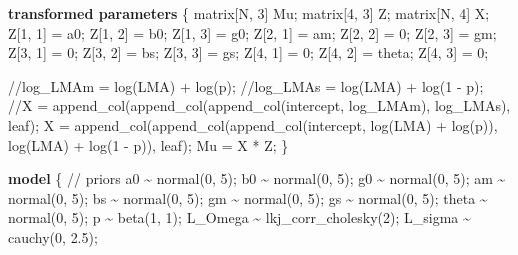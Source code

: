 \documentclass[
  12pt,
  letterpaper,
  DIV=11,
  numbers=noendperiod]{scrartcl}
\newenvironment{Shaded}{\begin{snugshade}}{\end{snugshade}}
\newcommand{\CommentTok}[1]{\textcolor[rgb]{0.37,0.37,0.37}{#1}}
\newcommand{\DataTypeTok}[1]{\textcolor[rgb]{0.68,0.00,0.00}{#1}}
\newcommand{\DecValTok}[1]{\textcolor[rgb]{0.68,0.00,0.00}{#1}}
\newcommand{\FloatTok}[1]{\textcolor[rgb]{0.68,0.00,0.00}{#1}}
\newcommand{\KeywordTok}[1]{\textcolor[rgb]{0.00,0.23,0.31}{\textbf{#1}}}
\newcommand{\NormalTok}[1]{\textcolor[rgb]{0.00,0.23,0.31}{#1}}
\numberwithin{equation}{section} %
\begin{document}
\begin{Shaded}
\begin{Highlighting}[]
\KeywordTok{transformed parameters}\NormalTok{ \{}
  \DataTypeTok{matrix}\NormalTok{[N, }\DecValTok{3}\NormalTok{] Mu;}
  \DataTypeTok{matrix}\NormalTok{[}\DecValTok{4}\NormalTok{, }\DecValTok{3}\NormalTok{] Z;}
  \DataTypeTok{matrix}\NormalTok{[N, }\DecValTok{4}\NormalTok{] X;}
\NormalTok{  Z[}\DecValTok{1}\NormalTok{, }\DecValTok{1}\NormalTok{] = a0;}
\NormalTok{  Z[}\DecValTok{1}\NormalTok{, }\DecValTok{2}\NormalTok{] = b0;}
\NormalTok{  Z[}\DecValTok{1}\NormalTok{, }\DecValTok{3}\NormalTok{] = g0;}
\NormalTok{  Z[}\DecValTok{2}\NormalTok{, }\DecValTok{1}\NormalTok{] = am;}
\NormalTok{  Z[}\DecValTok{2}\NormalTok{, }\DecValTok{2}\NormalTok{] = }\DecValTok{0}\NormalTok{;}
\NormalTok{  Z[}\DecValTok{2}\NormalTok{, }\DecValTok{3}\NormalTok{] = gm;}
\NormalTok{  Z[}\DecValTok{3}\NormalTok{, }\DecValTok{1}\NormalTok{] = }\DecValTok{0}\NormalTok{;}
\NormalTok{  Z[}\DecValTok{3}\NormalTok{, }\DecValTok{2}\NormalTok{] = bs;}
\NormalTok{  Z[}\DecValTok{3}\NormalTok{, }\DecValTok{3}\NormalTok{] = gs;}
\NormalTok{  Z[}\DecValTok{4}\NormalTok{, }\DecValTok{1}\NormalTok{] = }\DecValTok{0}\NormalTok{;}
\NormalTok{  Z[}\DecValTok{4}\NormalTok{, }\DecValTok{2}\NormalTok{] = theta;}
\NormalTok{  Z[}\DecValTok{4}\NormalTok{, }\DecValTok{3}\NormalTok{] = }\DecValTok{0}\NormalTok{;}

  \CommentTok{//log\_LMAm = log(LMA) + log(p);}
  \CommentTok{//log\_LMAs = log(LMA) + log(1 {-} p);}
  \CommentTok{//X = append\_col(append\_col(append\_col(intercept, log\_LMAm), log\_LMAs), leaf);}
\NormalTok{  X = append\_col(append\_col(append\_col(intercept,}
\NormalTok{    log(LMA) + log(p)),}
\NormalTok{    log(LMA) + log(}\DecValTok{1}\NormalTok{ {-} p)),}
\NormalTok{    leaf);}
\NormalTok{  Mu = X * Z;}
\NormalTok{\}}

\KeywordTok{model}\NormalTok{ \{}
  \CommentTok{// priors}
\NormalTok{  a0 \textasciitilde{} normal(}\DecValTok{0}\NormalTok{, }\DecValTok{5}\NormalTok{);}
\NormalTok{  b0 \textasciitilde{} normal(}\DecValTok{0}\NormalTok{, }\DecValTok{5}\NormalTok{);}
\NormalTok{  g0 \textasciitilde{} normal(}\DecValTok{0}\NormalTok{, }\DecValTok{5}\NormalTok{);}
\NormalTok{  am \textasciitilde{} normal(}\DecValTok{0}\NormalTok{, }\DecValTok{5}\NormalTok{);}
\NormalTok{  bs \textasciitilde{} normal(}\DecValTok{0}\NormalTok{, }\DecValTok{5}\NormalTok{);}
\NormalTok{  gm \textasciitilde{} normal(}\DecValTok{0}\NormalTok{, }\DecValTok{5}\NormalTok{);}
\NormalTok{  gs \textasciitilde{} normal(}\DecValTok{0}\NormalTok{, }\DecValTok{5}\NormalTok{);}
\NormalTok{  theta \textasciitilde{} normal(}\DecValTok{0}\NormalTok{, }\DecValTok{5}\NormalTok{);}
\NormalTok{  p \textasciitilde{} beta(}\DecValTok{1}\NormalTok{, }\DecValTok{1}\NormalTok{);}
\NormalTok{  L\_Omega \textasciitilde{} lkj\_corr\_cholesky(}\DecValTok{2}\NormalTok{);}
\NormalTok{  L\_sigma \textasciitilde{} cauchy(}\DecValTok{0}\NormalTok{, }\FloatTok{2.5}\NormalTok{);}


\end{Highlighting}
\end{Shaded}
\end{document}
